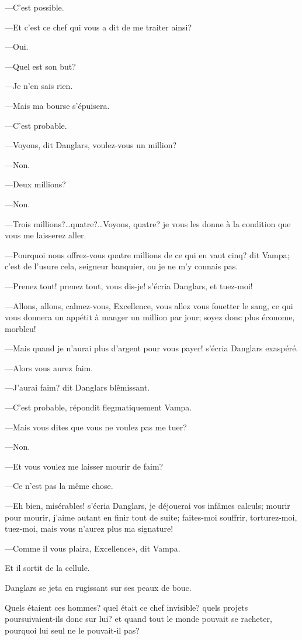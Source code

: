 —C'est possible. 

—Et c'est ce chef qui vous a dit de me traiter ainsi? 

—Oui. 

—Quel est son but? 

—Je n'en sais rien. 

—Mais ma bourse s'épuisera. 

—C'est probable. 

—Voyons, dit Danglars, voulez-vous un million? 

—Non. 

—Deux millions? 

—Non. 

—Trois millions?\dots quatre?\dots Voyons, quatre? je vous les donne à la condition que vous me laisserez aller. 

—Pourquoi nous offrez-vous quatre millions de ce qui en vaut cinq? dit Vampa; c'est de l'usure cela, seigneur banquier, ou je ne m'y connais pas. 

—Prenez tout! prenez tout, vous dis-je! s'écria Danglars, et tuez-moi! 

—Allons, allons, calmez-vous, Excellence, vous allez vous fouetter le sang, ce qui vous donnera un appétit à manger un million par jour; soyez donc plus économe, morbleu! 

—Mais quand je n'aurai plus d'argent pour vous payer! s'écria Danglars exaspéré. 

—Alors vous aurez faim. 

—J'aurai faim? dit Danglars blêmissant. 

—C'est probable, répondit flegmatiquement Vampa. 

—Mais vous dites que vous ne voulez pas me tuer? 

—Non. 

—Et vous voulez me laisser mourir de faim? 

—Ce n'est pas la même chose. 

—Eh bien, misérables! s'écria Danglars, je déjouerai vos infâmes calculs; mourir pour mourir, j'aime autant en finir tout de suite; faites-moi souffrir, torturez-moi, tuez-moi, mais vous n'aurez plus ma signature! 

—Comme il vous plaira, Excellence», dit Vampa. 

Et il sortit de la cellule. 

Danglars se jeta en rugissant sur ses peaux de bouc. 

Quels étaient ces hommes? quel était ce chef invisible? quels projets poursuivaient-ils donc sur lui? et quand tout le monde pouvait se racheter, pourquoi lui seul ne le pouvait-il pas? 

